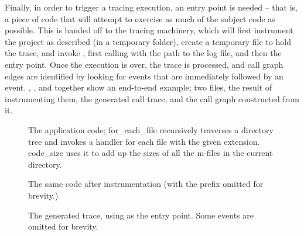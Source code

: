 Finally, in order to trigger a tracing execution, an entry point is needed --
that is, a piece of code that will attempt to exercise as much of the subject
code as possible. This is handed off to the tracing machinery, which will first
instrument the project as described (in a temporary folder), create a temporary
file to hold the trace, and invoke \matlab, first calling
 with the path to the log file, and then the
entry point. Once the execution is over, the trace is processed, and call
graph edges are identified by looking for  events that are
immediately followed by an  event. ,
,  and 
together show an end-to-end example; two \matlab files, the result of
instrumenting them, the generated call trace, and the call graph constructed
from it.


\begin{figure}[htbp]
\begin{minipage}{\linewidth}
  
\end{minipage}
\begin{minipage}{\linewidth}
  
\end{minipage}
\caption{The application code; for\_each\_file recursively traverses a directory
tree and invokes a handler for each file with the given extension. code\_size
uses it to add up the sizes of all the m-files in the current directory.}
\label{Fig:CallgraphBefore}
\end{figure}

\begin{figure}[htbp]
\begin{minipage}{\linewidth}
  
\end{minipage}
\begin{minipage}{\linewidth}
  
\end{minipage}
\caption{The same code after instrumentation (with the 
prefix omitted for brevity.)}
\label{Fig:CallgraphAfter}
\end{figure}

\begin{figure}[htbp]

\caption{The generated trace, using  as the entry point.
Some events are omitted for brevity.}
\label{Fig:CallgraphTrace}
\end{figure}

